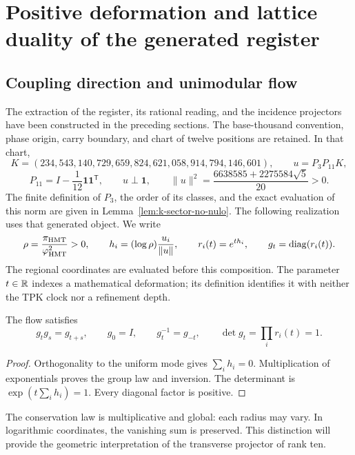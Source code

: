 \HMTMathematicalPaper
\section{Positive deformation and lattice duality of the generated register}
\label{rec:positiva}

\subsection{Coupling direction and unimodular flow}

The extraction of the register, its rational reading, and the incidence projectors have been constructed in the preceding sections. The base-thousand convention, phase origin, carry boundary, and chart of twelve positions are retained. In that chart,
\[
 K=(234,543,140,729,659,824,621,058,914,794,146,601),
 \qquad u=P_3P_{11}K,
\]
\[
 P_{11}=I-\frac1{12}\mathbf1\mathbf1^{\mathsf T},\qquad
 u\perp\mathbf1,\qquad
 \|u\|^2=\frac{6638585+2275584\sqrt5}{20}>0.
\]
The finite definition of \(P_3\), the order of its classes, and the exact evaluation of this norm are given in Lemma~\ref{lem:k-sector-no-nulo}. The following realization uses that generated object. We write
\begin{equation}
 \rho=\frac{\pi_{\mathrm{HMT}}}{\varphi_{\mathrm{HMT}}^2}>0,\qquad
 h_i=(\log\rho)\frac{u_i}{\|u\|},\qquad
 r_i(t)=e^{th_i},\qquad g_t=\operatorname{diag}(r_i(t)).
 \label{rec:eq:flujo}
\end{equation}
The regional coordinates are evaluated before this composition. The parameter \(t\in\mathbb R\) indexes a mathematical deformation; its definition identifies it with neither the TPK clock nor a refinement depth.

\begin{proposition}
\label{rec:prop:flujo}
The flow satisfies
\[
 g_tg_s=g_{t+s},\qquad g_0=I,\qquad g_t^{-1}=g_{-t},\qquad
 \det g_t=\prod_i r_i(t)=1.
\]
\end{proposition}
\begin{proof}
Orthogonality to the uniform mode gives \(\sum_i h_i=0\). Multiplication of exponentials proves the group law and inversion. The determinant is \(\exp(t\sum_i h_i)=1\). Every diagonal factor is positive.
\end{proof}

The conservation law is multiplicative and global: each radius may vary. In logarithmic coordinates, the vanishing sum is preserved. This distinction will provide the geometric interpretation of the transverse projector of rank ten.

